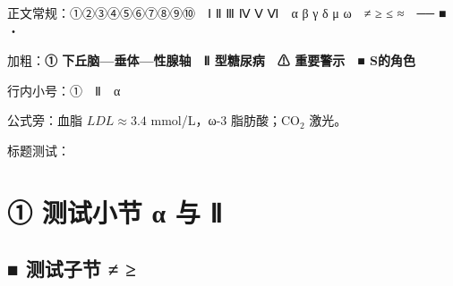 \documentclass[12pt,UTF8]{ctexbook}
\begin{document}
正文常规：①②③④⑤⑥⑦⑧⑨⑩　Ⅰ Ⅱ Ⅲ Ⅳ Ⅴ Ⅵ　α β γ δ μ ω　≠ ≥ ≤ ≈　── ■ ・

加粗：\textbf{① 下丘脑—垂体—性腺轴}　\textbf{Ⅱ 型糖尿病}　\textbf{⚠ 重要警示}　\textbf{■ S的角色}

行内小号：{\small ①}　{\footnotesize Ⅱ}　{\scriptsize α}

公式旁：血脂 $LDL \approx 3.4$ mmol/L，ω-3 脂肪酸；CO$_2$ 激光。

标题测试：
\section{① 测试小节 α 与 Ⅱ}
\subsection{■ 测试子节 ≠ ≥}
\end{document}
